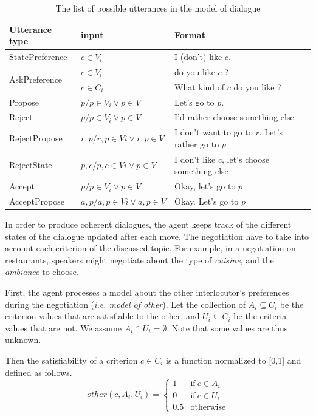\documentclass{llncs}
\begin{document}
		\begin{table}[h]
			\begin{tabular} {|p{2.5cm}|p{3.5cm}|p{6cm}|}
				\hline
				Utterance type & input & Format \\
				\hline
				StatePreference & $c \in V_i$ & I (don't) like $c$.\\
				\hline
				 \multirow{2}{*}{AskPreference} &$c \in V_i$ & do you like $c$ ?\\
				 \cline{2-3}
				 & $c \in C_i$ & What kind of $c$ do you like ? \\
				 \hline
				 Propose & $p / p\in V_i \vee p \in V$ & Let's go to $p$. \\
				 \hline
				 Reject & $p / p\in V_i \vee p \in V$ & I'd rather choose  something else \\
				 \hline
				 RejectPropose & $r, p / r,p\in Vi \vee r,p \in V $ & I don't want to go to $r$. Let's rather go to $p$ \\
				 \hline 
				 RejectState & $ p,c / p,c\in Vi \vee p \in V$ &  I don't like $c$, let's choose something else \\
				 \hline
				 Accept& $p / p\in V_i \vee p \in V$& Okay, let's go to $p$	 \\
				 \hline
				 AcceptPropose & $a,p / a,p\in Vi \vee a,p \in V $ & Okay. Let's go to $p$\\
				 \hline
			\end{tabular}
			\caption{The list of possible utterances in the model of dialogue}
		\end{table}
	
	In order to produce coherent dialogues, the agent keeps track of the different states of the dialogue updated after each move. 
	The negotiation have to take into account each criterion of the discussed topic. For example, in a negotiation on restaurants, speakers might negotiate about the type of \textit{cuisine}, and the \textit{ambiance} to choose.  
	
	First, the agent processes a model about the other interlocutor's preferences during the negotiation (\textit{i.e. model of other}). Let the collection of $A_i \subseteq C_i$ be the criterion values that are satisfiable to the other, and $U_i \subseteq C_i$ be the criteria values that are not.  We assume $A_i \cap U_i = \emptyset$.  Note that some values are thus unknown.
	
	Then the satisfiability of a criterion $c \in C_i$ is a function normalized to [0,1] and defined as follows.
	\begin{equation}
	other(c, A_i, U_i)= \left\{\begin{array}{ll}
	1	 & \mathrm{if\ }  c \in A_i\\
	0    & \mathrm{if\ }c \in U_i\\
	0.5	 & \mathrm{otherwise}
	\end{array}\right.
	\end{equation}
	
\end{document}
